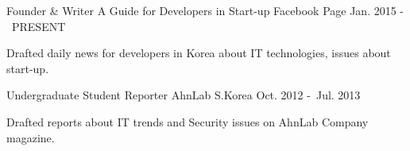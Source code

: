 

\begin{cventries}

  \cventry
    {Founder \& Writer} %
    {A Guide for Developers in Start-up} %
    {Facebook Page} %
    {Jan. 2015 -\ PRESENT} %
    {
      \begin{cvitems} %
        \item {Drafted daily news for developers in Korea about IT technologies, issues about start-up.}
      \end{cvitems}
    }

  \cventry
    {Undergraduate Student Reporter} %
    {AhnLab} %
    {S.Korea} %
    {Oct. 2012 -\ Jul. 2013} %
    {
      \begin{cvitems} %
        \item {Drafted reports about IT trends and Security issues on AhnLab Company magazine.}
      \end{cvitems}
    }

\end{cventries}
